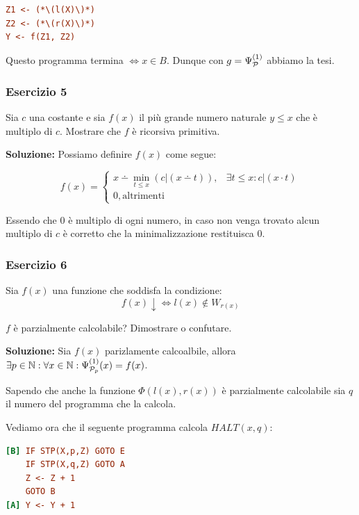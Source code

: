 \begin{lstlisting}[language=ini, caption={ }]
Z1 <- (*\(l(X)\)*)
Z2 <- (*\(r(X)\)*)
Y <- f(Z1, Z2)
\end{lstlisting}

Questo programma termina \(\iff x \in B\). Dunque con \(g=\Psi_{\mathcal{P}}^{(1)}\) abbiamo la tesi.

\subsubsection{Esercizio 5}

Sia \(c\) una costante e sia \(f(x)\) il più grande numero naturale \(y \leq x\) che è multiplo di \(c\). Mostrare che \(f\) è ricorsiva primitiva.

\textbf{Soluzione:} Possiamo definire \(f(x)\) come segue:

\begin{equation}
  f(x) =\begin{cases}
    x \dotminus \min_{t \leq x} (c \vert (x\dotminus t)), & \exists t \leq x: c\vert (x\cdot t)\\
    0, \text{altrimenti}
    \end{cases}
\end{equation}

Essendo che \(0\) è multiplo di ogni numero, in caso non venga trovato alcun multiplo di \(c\) è corretto che la minimalizzazione restituisca \(0\).

\subsubsection{Esercizio 6}

Sia \(f(x)\) una funzione che soddisfa la condizione:
\begin{equation}
  f(x) \downarrow \iff l(x) \nin W_{r(x)}
\end{equation}

\(f\) è parzialmente calcolabile? Dimostrare o confutare.

\textbf{Soluzione: } Sia \(f(x)\) parizlamente calcoalbile, allora \(\exists p \in \mathbb{N}: \forall x \in \mathbb{N} :\Psi_{\mathcal{P}_p}^{(1)}(x)=f(x)\).

Sapendo che anche la funzione \(\Phi(l(x), r(x))\) è parzialmente calcolabile sia \(q\) il numero del programma che la calcola.

Vediamo ora che il seguente programma calcola \(\textit{HALT}(x,q)\):

\begin{lstlisting}[language=ini, caption={ }]
[B] IF STP(X,p,Z) GOTO E
    IF STP(X,q,Z) GOTO A
    Z <- Z + 1
    GOTO B
[A] Y <- Y + 1
\end{lstlisting}

